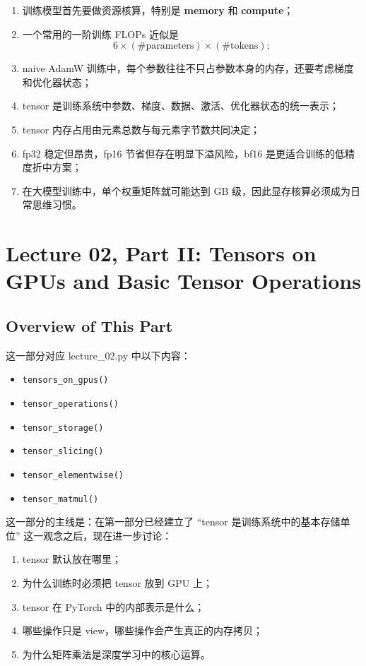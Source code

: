 \documentclass[a4paper,UTF8]{article}
\numberwithin{equation}{section}
\begin{document}
\begin{enumerate}
    \item 训练模型首先要做资源核算，特别是 \textbf{memory} 和 \textbf{compute}；
    \item 一个常用的一阶训练 FLOPs 近似是
    \[
    6 \times (\#\text{parameters}) \times (\#\text{tokens});
    \]
    \item naive AdamW 训练中，每个参数往往不只占参数本身的内存，还要考虑梯度和优化器状态；
    \item tensor 是训练系统中参数、梯度、数据、激活、优化器状态的统一表示；
    \item tensor 内存占用由元素总数与每元素字节数共同决定；
    \item fp32 稳定但昂贵，fp16 节省但存在明显下溢风险，bf16 是更适合训练的低精度折中方案；
    \item 在大模型训练中，单个权重矩阵就可能达到 GB 级，因此显存核算必须成为日常思维习惯。
\end{enumerate}


\section{Lecture 02, Part II: Tensors on GPUs and Basic Tensor Operations}

\subsection{Overview of This Part}

这一部分对应 lecture\_02.py 中以下内容：
\begin{itemize}
    \item \verb|tensors_on_gpus()|
    \item \verb|tensor_operations()|
    \item \verb|tensor_storage()|
    \item \verb|tensor_slicing()|
    \item \verb|tensor_elementwise()|
    \item \verb|tensor_matmul()|
\end{itemize}

这一部分的主线是：在第一部分已经建立了 ``tensor 是训练系统中的基本存储单位'' 这一观念之后，现在进一步讨论：
\begin{enumerate}
    \item tensor 默认放在哪里；
    \item 为什么训练时必须把 tensor 放到 GPU 上；
    \item tensor 在 PyTorch 中的内部表示是什么；
    \item 哪些操作只是 view，哪些操作会产生真正的内存拷贝；
    \item 为什么矩阵乘法是深度学习中的核心运算。
\end{enumerate}
\end{document}
